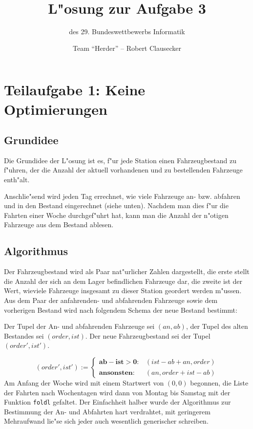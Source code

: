 \documentclass{scrreprt}
\author {Team "`Herder"' -- Robert Clausecker}
\title {L"osung zur Aufgabe 3}
\subtitle {des 29. Bundeswettbewerbs Informatik}
\begin{document}
\maketitle

\tableofcontents \newpage


\chapter {Teilaufgabe 1: Keine Optimierungen}

\section {Grundidee}
Die Grundidee der L"osung ist es, f"ur jede Station einen Fahrzeugbestand zu
f"uhren, der die Anzahl der aktuell vorhandenen und zu bestellenden Fahrzeuge
enth"alt.

Anschlie"send wird jeden Tag errechnet, wie viele Fahrzeuge an- bzw. abfahren
und in den Bestand eingerechnet (siehe unten). Nachdem man dies f"ur die Fahrten
einer Woche durchgef"uhrt hat, kann man die Anzahl der n"otigen Fahrzeuge aus
dem Bestand ablesen.

\section {Algorithmus}
Der Fahrzeugbestand wird als Paar nat"urlicher Zahlen dargestellt, die
erste stellt die Anzahl der sich an dem Lager befindlichen Fahrzeuge dar, die
zweite ist der Wert, wieviele Fahrzeuge insgesamt zu dieser Station geordert
werden m"ussen.  Aus dem Paar der anfahrenden- und abfahrenden Fahrzeuge sowie
dem vorherigen Bestand wird nach folgendem Schema der neue Bestand bestimmt:

Der Tupel der An- und abfahrenden Fahrzeuge sei $(an,ab)$, der
Tupel des alten Bestandes sei $(order,ist)$. Der neue Fahrzeugbestand sei
der Tupel $(order',ist')$.

$$
(order',ist') := \left \{\begin{array}{rl}
\mathbf{ab - ist > 0:} & (ist - ab + an, order)
\\
\mathbf{ansonsten:}    & (an, order + ist - ab)
\end{array}\right .$$
Am Anfang der Woche wird mit einem Startwert von $(0,0)$ begonnen, die Liste der
Fahrten nach Wochentagen wird dann von Montag bis Samstag mit der Funktion
\texttt{foldl} gefaltet.  Der Einfachheit halber wurde der Algorithmus zur
Bestimmung der An- und Abfahrten hart verdrahtet, mit geringerem Mehraufwand
lie"se sich jeder auch wesentlich generischer schreiben.
\end{document}
